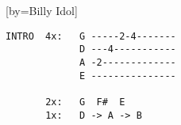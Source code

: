  

[by=Billy Idol]



\beginverse
\begin{verbatim}
INTRO  4x:   G -----2-4-------
             D ---4-----------
             A -2-------------
             E ---------------

       2x:   G  F#  E
       1x:   D -> A -> B 
\end{verbatim}
\endverse

